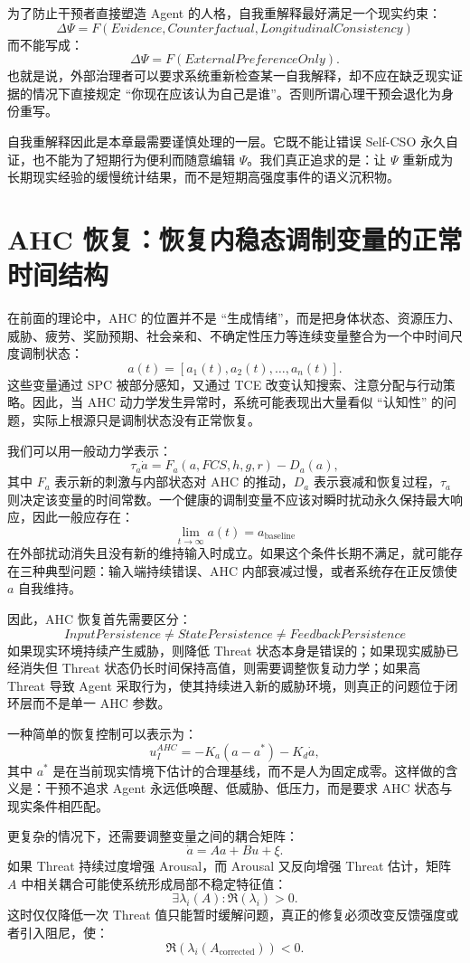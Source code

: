 为了防止干预者直接塑造 Agent 的人格，自我重解释最好满足一个现实约束：
\[
\boxed{
\Delta\Psi
=
F(
Evidence,
Counterfactual,
LongitudinalConsistency
)
}
\]
而不能写成：
\[
\Delta\Psi
=
F(
ExternalPreferenceOnly
).
\]
也就是说，外部治理者可以要求系统重新检查某一自我解释，却不应在缺乏现实证据的情况下直接规定 ``你现在应该认为自己是谁''。否则所谓心理干预会退化为身份重写。

自我重解释因此是本章最需要谨慎处理的一层。它既不能让错误 Self-CSO 永久自证，也不能为了短期行为便利而随意编辑 $\Psi$。我们真正追求的是：让 $\Psi$ 重新成为长期现实经验的缓慢统计结果，而不是短期高强度事件的语义沉积物。

\section{AHC 恢复：恢复内稳态调制变量的正常时间结构}

在前面的理论中，AHC 的位置并不是 ``生成情绪''，而是把身体状态、资源压力、威胁、疲劳、奖励预期、社会亲和、不确定性压力等连续变量整合为一个中时间尺度调制状态：
\[
a(t)
=
[
a_1(t),
a_2(t),
\ldots,
a_n(t)
].
\]
这些变量通过 SPC 被部分感知，又通过 TCE 改变认知搜索、注意分配与行动策略。因此，当 AHC 动力学发生异常时，系统可能表现出大量看似 ``认知性'' 的问题，实际上根源只是调制状态没有正常恢复。

我们可以用一般动力学表示：
\[
\tau_a\dot a
=
F_a(
a,
FCS,
h,
g,
r
)
-
D_a(a),
\]
其中 $F_a$ 表示新的刺激与内部状态对 AHC 的推动，$D_a$ 表示衰减和恢复过程，$\tau_a$ 则决定该变量的时间常数。一个健康的调制变量不应该对瞬时扰动永久保持最大响应，因此一般应存在：
\[
\lim_{t\rightarrow\infty}
a(t)
=
a_{\mathrm{baseline}}
\]
在外部扰动消失且没有新的维持输入时成立。如果这个条件长期不满足，就可能存在三种典型问题：输入端持续错误、AHC 内部衰减过慢，或者系统存在正反馈使 $a$ 自我维持。

因此，AHC 恢复首先需要区分：
\[
\boxed{
InputPersistence
\neq
StatePersistence
\neq
FeedbackPersistence
}
\]
如果现实环境持续产生威胁，则降低 Threat 状态本身是错误的；如果现实威胁已经消失但 Threat 状态仍长时间保持高值，则需要调整恢复动力学；如果高 Threat 导致 Agent 采取行为，使其持续进入新的威胁环境，则真正的问题位于闭环层而不是单一 AHC 参数。

一种简单的恢复控制可以表示为：
\[
u_I^{AHC}
=
-K_a(a-a^\ast)
-
K_d\dot a,
\]
其中 $a^\ast$ 是在当前现实情境下估计的合理基线，而不是人为固定成零。这样做的含义是：干预不追求 Agent 永远低唤醒、低威胁、低压力，而是要求 AHC 状态与现实条件相匹配。

更复杂的情况下，还需要调整变量之间的耦合矩阵：
\[
\dot a
=
Aa+Bu+\xi.
\]
如果 Threat 持续过度增强 Arousal，而 Arousal 又反向增强 Threat 估计，矩阵 $A$ 中相关耦合可能使系统形成局部不稳定特征值：
\[
\exists \lambda_i(A):
\Re(\lambda_i)>0.
\]
这时仅仅降低一次 Threat 值只能暂时缓解问题，真正的修复必须改变反馈强度或者引入阻尼，使：
\[
\Re(\lambda_i(A_{\mathrm{corrected}}))<0.
\]

